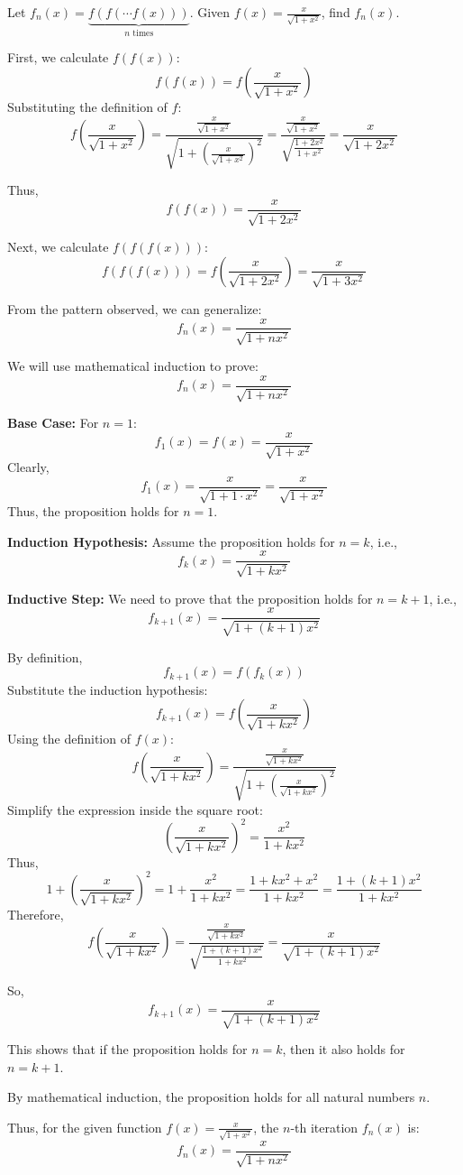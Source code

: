 \begin{exercise}
Let \( f_n(x) = \underbrace{f(f(\cdots f(x)))}_{n \text{ times}} \). Given \( f(x) = \frac{x}{\sqrt{1+x^2}} \), find \( f_n(x) \).
\end{exercise}

\begin{solution}
First, we calculate \( f(f(x)) \):
\[
f(f(x)) = f\left( \frac{x}{\sqrt{1 + x^2}} \right)
\]
Substituting the definition of \( f \):
\[
f\left( \frac{x}{\sqrt{1 + x^2}} \right) = \frac{\frac{x}{\sqrt{1 + x^2}}}{\sqrt{1 + \left( \frac{x}{\sqrt{1 + x^2}} \right)^2}} = \frac{\frac{x}{\sqrt{1 + x^2}}}{\sqrt{\frac{1 + 2x^2}{1 + x^2}}} = \frac{x}{\sqrt{1 + 2x^2}}
\]

Thus,
\[
f(f(x)) = \frac{x}{\sqrt{1 + 2x^2}}
\]

Next, we calculate \( f(f(f(x))) \):
\[
f(f(f(x))) = f\left( \frac{x}{\sqrt{1 + 2x^2}} \right) = \frac{x}{\sqrt{1 + 3x^2}}
\]

From the pattern observed, we can generalize:
\[
f_n(x) = \frac{x}{\sqrt{1 + nx^2}}
\]

We will use mathematical induction to prove:
\[
f_n(x) = \frac{x}{\sqrt{1 + nx^2}}
\]

\textbf{Base Case:} For \( n = 1 \):
\[
f_1(x) = f(x) = \frac{x}{\sqrt{1 + x^2}}
\]
Clearly,
\[
f_1(x) = \frac{x}{\sqrt{1 + 1 \cdot x^2}} = \frac{x}{\sqrt{1 + x^2}}
\]
Thus, the proposition holds for \( n = 1 \).

\textbf{Induction Hypothesis:} Assume the proposition holds for \( n = k \), i.e.,
\[
f_k(x) = \frac{x}{\sqrt{1 + kx^2}}
\]

\textbf{Inductive Step:} We need to prove that the proposition holds for \( n = k+1 \), i.e.,
\[
f_{k+1}(x) = \frac{x}{\sqrt{1 + (k+1)x^2}}
\]

By definition,
\[
f_{k+1}(x) = f(f_k(x))
\]
Substitute the induction hypothesis:
\[
f_{k+1}(x) = f\left( \frac{x}{\sqrt{1 + kx^2}} \right)
\]
Using the definition of \( f(x) \):
\[
f\left( \frac{x}{\sqrt{1 + kx^2}} \right) = \frac{\frac{x}{\sqrt{1 + kx^2}}}{\sqrt{1 + \left( \frac{x}{\sqrt{1 + kx^2}} \right)^2}}
\]
Simplify the expression inside the square root:
\[
\left( \frac{x}{\sqrt{1 + kx^2}} \right)^2 = \frac{x^2}{1 + kx^2}
\]
Thus,
\[
1 + \left( \frac{x}{\sqrt{1 + kx^2}} \right)^2 = 1 + \frac{x^2}{1 + kx^2} = \frac{1 + kx^2 + x^2}{1 + kx^2} = \frac{1 + (k+1)x^2}{1 + kx^2}
\]
Therefore,
\[
f\left( \frac{x}{\sqrt{1 + kx^2}} \right) = \frac{\frac{x}{\sqrt{1 + kx^2}}}{\sqrt{\frac{1 + (k+1)x^2}{1 + kx^2}}} = \frac{x}{\sqrt{1 + (k+1)x^2}}
\]

So,
\[
f_{k+1}(x) = \frac{x}{\sqrt{1 + (k+1)x^2}}
\]

This shows that if the proposition holds for \( n = k \), then it also holds for \( n = k+1 \).

By mathematical induction, the proposition holds for all natural numbers \( n \).

Thus, for the given function \( f(x) = \frac{x}{\sqrt{1 + x^2}} \), the \( n \)-th iteration \( f_n(x) \) is:
\[
f_n(x) = \frac{x}{\sqrt{1 + nx^2}}
\]
\end{solution}

